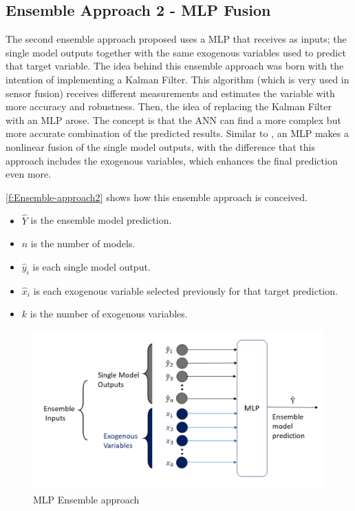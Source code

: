 \subsection{Ensemble Approach 2 - MLP Fusion}
\label{s:Ensemble-Approach2}
The second ensemble approach proposed uses a \ac{MLP} that receives as inputs; the single model outputs together with the same exogenous variables used to predict that target variable. 
The idea behind this ensemble approach was born with the intention of implementing a Kalman Filter. This algorithm (which is very used in sensor fusion) receives different measurements and estimates the variable with more accuracy and robustness. 
Then, the idea of replacing the Kalman Filter with an \ac{MLP} arose. The concept is that the \ac{ANN} can find a more complex but more accurate combination of the predicted results.
Similar to \cite{Nourani2018}, an \ac{MLP} makes a nonlinear fusion of the single model outputs, with the difference that this approach includes the exogenous variables, which enhances the final prediction even more. 

\autoref{f:Ensemble-approach2} shows how this ensemble approach is conceived. 

\begin{itemize}
    \item \begin{math}\hat{Y}\end{math} is the ensemble model prediction.
    \item \begin{math}n\end{math} is the number of models.
    \item \begin{math}\hat{y}_i\end{math} is each single model output.
    \item \begin{math}\hat{x}_i\end{math} is each exogenous variable selected previously for that target prediction.
    \item \begin{math}k\end{math} is the number of exogenous variables.
\end{itemize}

\begin{figure}[h]
\centering
\includegraphics[width=\linewidth]{figures/Ch4/Ensemble_Approach2.pdf}
\caption{MLP Ensemble approach}
\label{f:Ensemble-approach2}
\end{figure}

